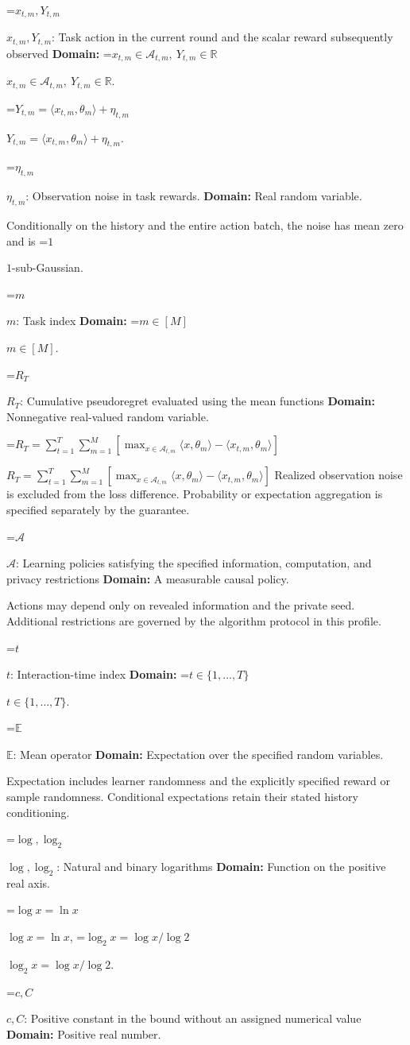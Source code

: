 \documentclass[10pt,a4paper]{article}
\newcommand{\AtlasMath}[1]{\par\begingroup\centering\setbox0=\hbox{$\displaystyle #1$}\ifdim\wd0>1.4\linewidth\typeout{ATLAS WIDE FORMULA: \the\wd0}\fi\ifdim\wd0>\linewidth\resizebox{\linewidth}{!}{\box0}\else\box0\fi\par\endgroup}
\newcommand{\AtlasInlineMath}[1]{\begingroup\setbox0=\hbox{$#1$}\ifdim\wd0>.4\linewidth\endgroup\AtlasMath{#1}\else\endgroup$#1$\fi}
\begin{document}
\AtlasInlineMath{x_{t,m},Y_{t,m}}: Task action in the current round and the scalar reward subsequently observed \textbf{Domain:} \AtlasInlineMath{x_{t,m}\in\mathcal A_{t,m},\ Y_{t,m}\in\mathbb R}.

\AtlasInlineMath{Y_{t,m}=\langle x_{t,m},\theta_m\rangle+\eta_{t,m}}.

\AtlasInlineMath{\eta_{t,m}}: Observation noise in task rewards. \textbf{Domain:} Real random variable.

Conditionally on the history and the entire action batch, the noise has mean zero and is \AtlasInlineMath{1}-sub-Gaussian.

\AtlasInlineMath{m}: Task index \textbf{Domain:} \AtlasInlineMath{m\in[M]}.

\AtlasInlineMath{R_T}: Cumulative pseudoregret evaluated using the mean functions \textbf{Domain:} Nonnegative real-valued random variable.

\AtlasInlineMath{R_T=\sum_{t=1}^T\sum_{m=1}^M[\max_{x\in\mathcal A_{t,m}}\langle x,\theta_m\rangle-\langle x_{t,m},\theta_m\rangle]} Realized observation noise is excluded from the loss difference. Probability or expectation aggregation is specified separately by the guarantee.

\AtlasInlineMath{\mathcal A}: Learning policies satisfying the specified information, computation, and privacy restrictions \textbf{Domain:} A measurable causal policy.

Actions may depend only on revealed information and the private seed. Additional restrictions are governed by the algorithm protocol in this profile.

\AtlasInlineMath{t}: Interaction-time index \textbf{Domain:} \AtlasInlineMath{t\in\{1,\ldots,T\}}.

\AtlasInlineMath{\mathbb E}: Mean operator \textbf{Domain:} Expectation over the specified random variables.

Expectation includes learner randomness and the explicitly specified reward or sample randomness. Conditional expectations retain their stated history conditioning.

\AtlasInlineMath{\log,\log_2}: Natural and binary logarithms \textbf{Domain:} Function on the positive real axis.

\AtlasInlineMath{\log x=\ln x}, \AtlasInlineMath{\log_2x=\log x/\log2}.

\AtlasInlineMath{c,C}: Positive constant in the bound without an assigned numerical value \textbf{Domain:} Positive real number.
\end{document}
